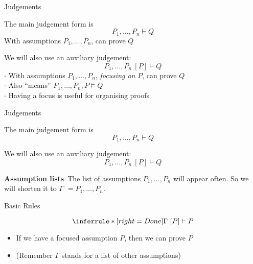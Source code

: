 \documentclass[xetex,aspectratio=169,14pt,hyperref={pdfpagelabels=true,pdflang={en-GB}}]{beamer}
\begin{document}
\begin{frame}[t]
  {Judgements}

  The main judgement form is
  \begin{displaymath}
    P_1, \dots, P_n \vdash Q
  \end{displaymath}
  \qquad \textcolor{black!60}{With assumptions $P_1,\dots,P_n$, can prove $Q$}

  \pause
  \bigskip

  We will also use an auxiliary judgement:
  \begin{displaymath}
    P_1, \dots, P_n~[P] \vdash Q
  \end{displaymath}
  \quad \textcolor{black!60}{$\cdot$ With assumptions $P_1,\dots,P_n$, \emph{focusing on} $P$, can prove $Q$}\\
  \quad \textcolor{black!60}{$\cdot$ Also ``means'' $P_1,\dots,P_n,P \models Q$}\\
  \quad \textcolor{black!60}{$\cdot$ Having a focus is useful for organising proofs}
\end{frame}

\begin{frame}[t]
  {Judgements}

  The main judgement form is
  \begin{displaymath}
    P_1, \dots, P_n \vdash Q
  \end{displaymath}

  \medskip

  We will also use an auxiliary judgement:
  \begin{displaymath}
    P_1, \dots, P_n~[P] \vdash Q
  \end{displaymath}

  \pause
  \bigskip

  \textbf{Assumption lists}~The list of assumptions
  $P_1, \dots, P_n$ will appear often. So we
  will shorten it to $\Gamma$
  \textcolor{black!60}{$ = P_1, \dots, P_n$}.
\end{frame}

\newcommand{\pUse}[1]{\texttt{use}~#1\texttt{,}~}
\newcommand{\pDone}{\texttt{done}}
\newcommand{\pSplit}[2]{\texttt{split(}#1~\texttt{|}~#2\texttt{)}}
\newcommand{\pFst}{\texttt{first,}~}
\newcommand{\pSnd}{\texttt{second,}~}
\newcommand{\pTrue}{\texttt{true}}


\begin{frame}
  {Basic Rules}

  \begin{displaymath}
    \inferrule* [right=Done]
    { }
    {\Gamma~[P] \vdash P}
  \end{displaymath}

  \bigskip
  \bigskip
  \pause

  \begin{itemize}
  \item If we have a focused assumption $P$, then we can prove $P$
  \item (Remember $\Gamma$ stands for a list of other assumptions)
  \end{itemize}
\end{frame}
\end{document}
